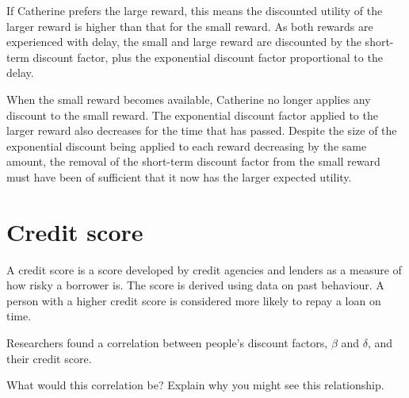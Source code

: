 \documentclass[
  letterpaper,
  DIV=11,
  numbers=noendperiod]{scrreprt}
\begin{document}
\begin{tcolorbox}[enhanced jigsaw, title=\textcolor{quarto-callout-tip-color}{\faLightbulb}\hspace{0.5em}{Answer}, toprule=.15mm, colback=white, breakable, titlerule=0mm, colframe=quarto-callout-tip-color-frame, coltitle=black, opacityback=0, rightrule=.15mm, colbacktitle=quarto-callout-tip-color!10!white, bottomtitle=1mm, opacitybacktitle=0.6, arc=.35mm, bottomrule=.15mm, toptitle=1mm, leftrule=.75mm, left=2mm]

If Catherine prefers the large reward, this means the discounted utility
of the larger reward is higher than that for the small reward. As both
rewards are experienced with delay, the small and large reward are
discounted by the short-term discount factor, plus the exponential
discount factor proportional to the delay.

When the small reward becomes available, Catherine no longer applies any
discount to the small reward. The exponential discount factor applied to
the larger reward also decreases for the time that has passed. Despite
the size of the exponential discount being applied to each reward
decreasing by the same amount, the removal of the short-term discount
factor from the small reward must have been of sufficient that it now
has the larger expected utility.

\end{tcolorbox}

\hypertarget{credit-score}{%
\section{Credit score}\label{credit-score}}

A credit score is a score developed by credit agencies and lenders as a
measure of how risky a borrower is. The score is derived using data on
past behaviour. A person with a higher credit score is considered more
likely to repay a loan on time.

Researchers found a correlation between people's discount factors,
\(\beta\) and \(\delta\), and their credit score.

What would this correlation be? Explain why you might see this
relationship.
\end{document}
